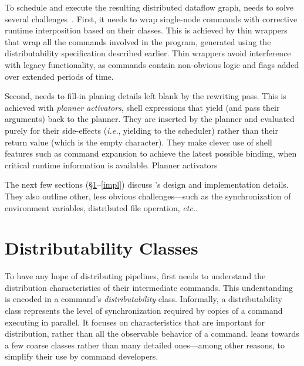 \documentclass[sigplan,10pt,review,anonymous]{acmart}
\newcommand{\ie}{{\em i.e.}, }
\newcommand{\etc}{{\em etc.}\xspace}
\newcommand{\ttt}[1]{\texttt{\small #1}}
\newcommand{\nv}[1]{[{\color{cyan}#1 --- nv}]}
\newcommand{\kk}[1]{[{\color{magenta}#1 --- kk}]}
\begin{document}
To schedule and execute the resulting distributed dataflow graph, \sys needs to solve several challenges~.
First, it needs to wrap single-node commands with corrective runtime interposition based on their classes.
This is achieved by thin wrappers that wrap all the commands involved in the program, generated using the distributability specification described earlier.
Thin wrappers avoid interference with legacy functionality, as \unix commands contain non-obvious logic and flags added over extended periods of time.

Second, \sys needs to fill-in planing details left blank by the rewriting pass.
This is achieved with \emph{planner activators}, shell expressions that yield (and pass their arguments) back to the planner.
They are inserted by the planner and evaluated purely for their side-effects (\ie yielding to the scheduler) rather than their return value (which is the empty character).
They make clever use of shell features such as command expansion to achieve the latest possible binding, when critical runtime information is available.
Planner activators 




The next few sections (\S\ref{distributability}--\ref{impl}) discuss \sys's design and implementation details.
They also outline other, less obvious challenges---such as the synchronization of environment variables, distributed file operation, \etc.


\section{Distributability Classes}
\label{distributability}

To have any hope of distributing \unix pipelines, \sys first needs to understand the distribution characteristics of their intermediate commands.
This understanding is encoded in a command's \emph{distributability} class.
Informally, a distributability class represents the level of synchronization required by copies of a command executing in parallel.
It focuses on characteristics that are important for distribution, rather than all the observable behavior of a command.
\sys leans towards a few coarse classes rather than many detailed ones---among other reasons, to simplify their use by command developers.
\end{document}

